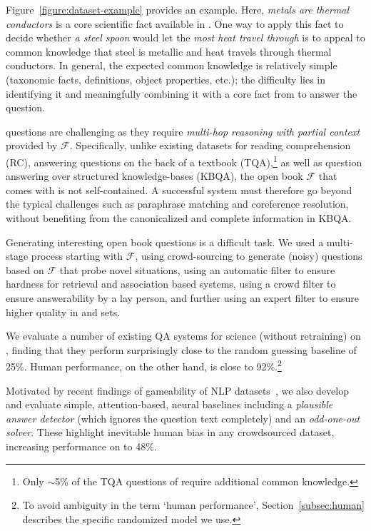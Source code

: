 Figure~\ref{figure:dataset-example} provides an example. Here, \emph{metals are thermal conductors} is a core scientific fact available in \Fs. One way to apply this fact to decide whether \emph{a steel spoon} would let the \emph{most heat travel through} is to appeal to common knowledge that steel is metallic and heat travels through thermal conductors. In general, the expected common knowledge is relatively simple (taxonomic facts, definitions, object properties, etc.); the difficulty lies in identifying it and meaningfully combining it with a core fact from \Fs to answer the question.

\obqa questions are challenging as they require \emph{multi-hop reasoning with partial context} provided by $\mathcal{F}$. Specifically, unlike existing datasets for reading comprehension (RC), answering questions on the back of a textbook (TQA),\footnote{Only $\sim$5\% of the TQA questions of \citet{Kembhavi2017AreYS} require additional common knowledge.} as well as question answering over structured knowledge-bases (KBQA), the open book $\mathcal{F}$ that comes with \obqa is not self-contained. A successful system must therefore go beyond the typical challenges such as paraphrase matching and coreference resolution, without benefiting from the canonicalized and complete information in KBQA.

Generating interesting open book questions is a difficult task. We used a multi-stage process starting with $\mathcal{F}$, using crowd-sourcing to generate (noisy) questions based on $\mathcal{F}$ that probe novel situations, using an automatic filter to ensure hardness for retrieval and association based systems, using a crowd filter to ensure answerability by a lay person, and further using an expert filter to ensure higher quality in \devname and \testname sets.

We evaluate a number of existing QA systems for science (without retraining) on \obqa, finding that they perform surprisingly close to the random guessing baseline of 25\%. Human performance, on the other hand, is close to 92\%.\footnote{To avoid ambiguity in the term `human performance', Section~\ref{subsec:human} describes the specific randomized model we use.}

Motivated by recent findings of gameability of NLP datasets~\cite{Gururangan2018AnnotationAI}, we also develop and evaluate simple, attention-based, neural baselines including a \emph{plausible answer detector} (which ignores the question text completely) and an \emph{odd-one-out solver}. These highlight inevitable human bias in any crowdsourced dataset, increasing performance on \obqa to 48\%.

